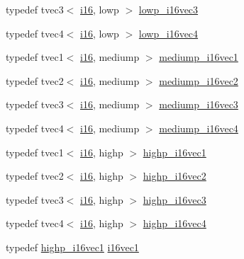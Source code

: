\begin{DoxyCompactItemize}
\item 
typedef tvec3$<$ \hyperlink{group__gtc__type__precision_ga35e5542ca05b29cc256fdafb8503d1fd}{i16}, lowp $>$ \hyperlink{namespaceglm_a0129c7acf0bf10176de2b14dce1b75a4}{lowp\+\_\+i16vec3}
\item 
typedef tvec4$<$ \hyperlink{group__gtc__type__precision_ga35e5542ca05b29cc256fdafb8503d1fd}{i16}, lowp $>$ \hyperlink{namespaceglm_a2b67d6527ade6fa80ecdec107dbe3131}{lowp\+\_\+i16vec4}
\item 
typedef tvec1$<$ \hyperlink{group__gtc__type__precision_ga35e5542ca05b29cc256fdafb8503d1fd}{i16}, mediump $>$ \hyperlink{namespaceglm_a44708bca96da21c5887ca277cf26ddc8}{mediump\+\_\+i16vec1}
\item 
typedef tvec2$<$ \hyperlink{group__gtc__type__precision_ga35e5542ca05b29cc256fdafb8503d1fd}{i16}, mediump $>$ \hyperlink{namespaceglm_a30e41646d450633d867c38d82c113ba0}{mediump\+\_\+i16vec2}
\item 
typedef tvec3$<$ \hyperlink{group__gtc__type__precision_ga35e5542ca05b29cc256fdafb8503d1fd}{i16}, mediump $>$ \hyperlink{namespaceglm_ab7fe8fe919b172a99f22b6c86a4cfda6}{mediump\+\_\+i16vec3}
\item 
typedef tvec4$<$ \hyperlink{group__gtc__type__precision_ga35e5542ca05b29cc256fdafb8503d1fd}{i16}, mediump $>$ \hyperlink{namespaceglm_a36db2c2e6dcc57ca23b992e3ff9937ad}{mediump\+\_\+i16vec4}
\item 
typedef tvec1$<$ \hyperlink{group__gtc__type__precision_ga35e5542ca05b29cc256fdafb8503d1fd}{i16}, highp $>$ \hyperlink{namespaceglm_a741838c5e5f121568ab45e2605168a87}{highp\+\_\+i16vec1}
\item 
typedef tvec2$<$ \hyperlink{group__gtc__type__precision_ga35e5542ca05b29cc256fdafb8503d1fd}{i16}, highp $>$ \hyperlink{namespaceglm_a9a46126d0bf9ceb121df6109ac8da717}{highp\+\_\+i16vec2}
\item 
typedef tvec3$<$ \hyperlink{group__gtc__type__precision_ga35e5542ca05b29cc256fdafb8503d1fd}{i16}, highp $>$ \hyperlink{namespaceglm_a197812ee8b57e9c7b4fca157443426a1}{highp\+\_\+i16vec3}
\item 
typedef tvec4$<$ \hyperlink{group__gtc__type__precision_ga35e5542ca05b29cc256fdafb8503d1fd}{i16}, highp $>$ \hyperlink{namespaceglm_a08c1756ac7347ffb0aaa2eba3c200e1e}{highp\+\_\+i16vec4}
\item 
typedef \hyperlink{namespaceglm_a741838c5e5f121568ab45e2605168a87}{highp\+\_\+i16vec1} \hyperlink{group__gtc__type__precision_gacec84a02174e44363dd105769fb22473}{i16vec1}
\item 

\end{DoxyCompactItemize}
